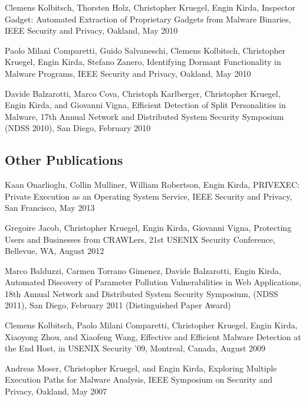 \documentclass[letterpaper,twoside,11pt,headings=small]{scrartcl}
\begin{document}
\vspace*{1em}
\noindent Clemens Kolbitsch, Thorsten Holz, Christopher Kruegel, Engin Kirda,
Inspector Gadget: Automated Extraction of Proprietary Gadgets from
Malware Binaries, IEEE Security and Privacy, Oakland, May 2010

\vspace*{1em}
\noindent Paolo Milani Comparetti, Guido Salvaneschi, Clemens Kolbitsch,
Christopher Kruegel, Engin Kirda, Stefano Zanero, Identifying Dormant
Functionality in Malware Programs, IEEE Security and Privacy, Oakland,
May 2010

\vspace*{1em}
\noindent Davide Balzarotti, Marco Cova, Christoph Karlberger, Christopher
Kruegel, Engin Kirda, and Giovanni Vigna, Efficient Detection of Split
Personalities in Malware, 17th Annual Network and Distributed System
Security Symposium (NDSS 2010), San Diego, February 2010

\subsection*{Other Publications}

\vspace*{1em}
\noindent Kaan Onarlioglu, Collin Mulliner, William Robertson, Engin
Kirda, PRIVEXEC: Private Execution as an Operating System Service,
IEEE Security and Privacy, San Francisco, May 2013

\vspace*{1em}
\noindent Gregoire Jacob, Christopher Kruegel, Engin Kirda, Giovanni
Vigna, Protecting Users and Businesses from CRAWLers, 21st USENIX
Security Conference, Bellevue, WA, August 2012

\vspace*{1em}
\noindent Marco Balduzzi, Carmen Torrano Gimenez, Davide Balzarotti, Engin
Kirda, Automated Discovery of Parameter Pollution Vulnerabilities in
Web Applications, 18th Annual Network and Distributed System Security
Symposium, (NDSS 2011), San Diego, February 2011 (Distinguished Paper
Award)

\vspace*{1em}
\noindent Clemens Kolbitsch, Paolo Milani Comparetti, Christopher Kruegel, Engin
Kirda, Xiaoyong Zhou, and Xiaofeng Wang, Effective and Efficient
Malware Detection at the End Host, in USENIX Security '09, Montreal,
Canada, August 2009

\vspace*{1em}
\noindent Andreas Moser, Christopher Kruegel, and Engin Kirda, Exploring
Multiple Execution Paths for Malware Analysis, IEEE Symposium on
Security and Privacy, Oakland, May 2007
\end{document}
